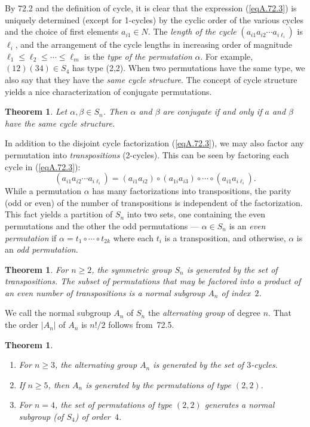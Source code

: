 \documentclass{surv-l}
\numberwithin{equation}{section}
\numberwithin{table}{section}
\numberwithin{figure}{section}
\theoremstyle{plain}
\newtheorem{theorem}[equation]{Theorem}
\theoremstyle{definition}
\begin{document}
By 72.2 and the definition of cycle, it is clear that the
expression (\ref{eqA.72.3}) is uniquely determined (except for
1-cycles) by the cyclic order of the various cycles and the choice
of first elements $a_{i1}\in N$. The \emph{length of the cycle}
$(a_{i1}a_{i2}\cdots a_{i\ell_{i}})$ is $\ell_{i}$, and the
arrangement of the cycle lengths in increasing order of magnitude
$\ell_{1}\leq \ell_{2}\leq\cdots\leq\ell_{m}$ is the \emph{type of
the permutation} $\alpha$. For example, $(12)(34) \in S_{4}$ has
type (2,2). When two permutations have the same type, we also say
that they have the \emph{same cycle structure}. The concept of
cycle structure yields a nice characterization of conjugate
permutations.

\begin{theorem}\label{thmA.72.4}
Let $\alpha,\beta\in S_{n}$. Then $\alpha$ and $\beta$ are
conjugate if and only if $a$ and $\beta$ have the same cycle
structure.
\end{theorem}

In addition to the disjoint cycle factorization (\ref{eqA.72.3}),
we may also factor any permutation into \emph{transpositions}
(2-cycles). This can be seen by factoring each cycle in
(\ref{eqA.72.3}):
\[
(a_{i1}a_{i2}\cdots a_{i\ell_{i}})=(a_{i1}a_{i2})\circ(a_{1i}a_{i3})\circ\cdots\circ(a_{i1}a_{i\ell_{i}}).
\]
While a permutation $\alpha$ has many factorizations into
transpositions, the parity (odd or even) of the number of
transpositions is independent of the factorization. This fact
yields a partition of $S_{n}$ into two sets, one containing
the even permutations and the other the odd permutations
--- $\alpha\in S_{n}$ is an \emph{even permutation} if
$\alpha=t_{1}\circ \cdots \circ t_{2k}$ where each $t_{i}$ is a
transposition, and otherwise, $\alpha$ is an \emph{odd
permutation}.

\begin{theorem}\label{thmA.72.5}
For $n \geq 2$, the symmetric group $S_{n}$
is generated by the set of transpositions. The subset of
permutations that may be factored into a product of an even number
of transpositions is a normal subgroup $A_{n}$ of index~$2$.
\end{theorem}

We call the normal subgroup $A_{n}$ of $S_{n}$ the
\emph{alternating group} of degree $n$.
That the order $|A_{n}|$ of $A_{n}$ is $n!/2$ follows from~72.5.

\begin{theorem}\label{thmA.72.6}
\begin{enumerate}
\item[({\it i})] For $n\geq 3$, the alternating group $A_{n}$
is generated by the set of $3$-cycles.

\item[({\it ii})] If $n \geq 5$, then $A_{n}$ is generated
by the permutations of type $(2,2)$.

\item[({\it iii})] For $n =4$, the set of permutations of type
$(2, 2)$ generates a normal subgroup (of $S_{4}$) of order~$4$.
\end{enumerate}
\end{theorem}
\end{document}
